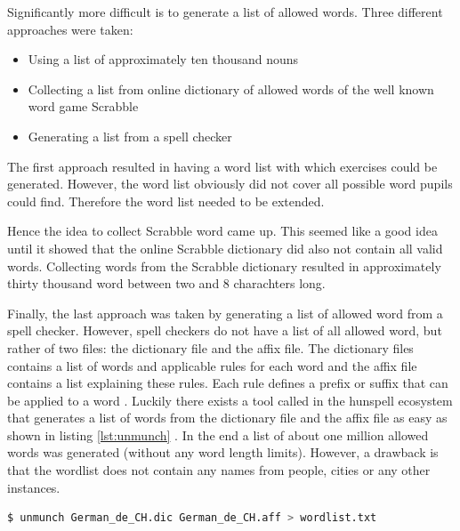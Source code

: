 Significantly more difficult is to generate a list of allowed words. Three different approaches were taken:

\begin{itemize}
  \item Using a list of approximately ten thousand nouns
  \item Collecting a list from online dictionary of allowed words of the well known word game Scrabble \cite{Scrabble}
  \item Generating a list from a spell checker
\end{itemize}

The first approach resulted in having a word list with which exercises could be generated. However, the word list obviously did not cover all possible word pupils could find. Therefore the word list needed to be extended.

Hence the idea to collect Scrabble word came up. This seemed like a good idea until it showed that the online Scrabble dictionary did also not contain all valid words.
Collecting words from the Scrabble dictionary resulted in approximately thirty thousand word between two and 8 charachters long.

Finally, the last approach was taken by generating a list of allowed word from a spell checker. However, spell checkers do not have a list of all allowed word, but rather of two files: the dictionary file and the affix file. The dictionary files contains a list of words and applicable rules for each word and the affix file contains a list explaining these rules. Each rule defines a prefix or suffix that can be applied to a word \cite{Hunspell}. 
Luckily there exists a tool called  in the hunspell ecosystem that generates a list of words from the dictionary file and the affix file as easy as shown in listing \ref{lst:unmunch} \cite{HunspellGithub}.
In the end a list of about one million allowed words was generated (without any word length limits). However, a drawback is that the wordlist does not contain any names from people, cities or any other instances. 

\begin{lstlisting}[language=Bash,caption={Bash command to unmunch a dictionary file and a affix file to a list of wird},label={lst:unmunch}]
$ unmunch German_de_CH.dic German_de_CH.aff > wordlist.txt
\end{lstlisting}

